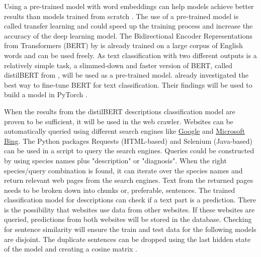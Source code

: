 \documentclass[a4paper, 12pt, oneside]{book} %
\begin{document}
Using a pre-trained model with word embeddings can help models achieve better results than models trained from scratch \autocite{mikolov_distributed_2013}.
The use of a pre-trained model is called transfer learning and could speed up the training process and increase the accuracy of the deep learning model.
The Bidirectional Encoder Representations from Transformers (BERT) by \textcite{devlin_bert_2019} is already trained on a large corpus of English words and can be used freely.
As text classification with two different outputs is a relatively simple task, a slimmed-down and faster version of BERT, called distilBERT from \textcite{sanh_distilbert_2020}, will be used as a pre-trained model.
\textcite{sun_how_2020} already investigated the best way to fine-tune BERT for text classification. 
Their findings will be used to build a model in PyTorch \autocite{paszke_pytorch_2019}.

When the results from the distilBERT descriptions classification model are proven to be sufficient, it will be used in the web crawler.
Websites can be automatically queried using different search engines like \href{www.google.com}{Google} and \href{www.bing.com}{Microsoft Bing}.
The Python packages Requests (HTML-based) and Selenium (Java-based) can be used in a script to query the search engines.
Queries could be constructed by using species names plus "description" or "diagnosis". 
When the right species/query combination is found, it can iterate over the species names and return relevant web pages from the search engines.
Text from the returned pages needs to be broken down into chunks or, preferable, sentences.
The trained classification model for descriptions can check if a text part is a prediction.
There is the possibility that websites use data from other websites.
If these websites are queried, predictions from both websites will be stored in the database.
Checking for sentence similarity will ensure the train and test data for the following models are disjoint.
The duplicate sentences can be dropped using the last hidden state of the model and creating a cosine matrix \autocite{reimers_sentence-bert_2019}.
\end{document}

